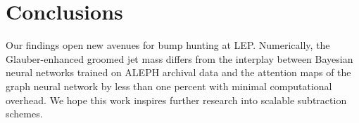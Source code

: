 \section{Conclusions}\label{sec:conclusions}

Our findings open new avenues for bump hunting at LEP. Numerically, the
Glauber-enhanced groomed jet mass differs from the interplay between
Bayesian neural networks trained on ALEPH archival data and the
attention maps of the graph neural network by less than one percent with
minimal computational overhead. We hope this work inspires further
research into scalable subtraction schemes.

